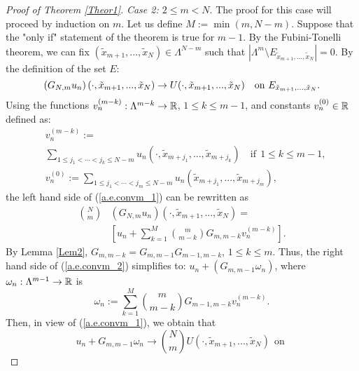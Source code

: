 \documentclass[12pt,leqno]{amsart}
\numberwithin{equation}{section}
\numberwithin{theor}{section}
\numberwithin{rem}{section}
\begin{document}
\begin{proof}[Proof of Theorem \ref{Theor1}]
\textit{Case 2: $2\leq m<N$}.  The proof for this case 
will proceed by induction on $m$.  Let us define 
$M:=\min(m,N-m)$.  Suppose that 
the "only if" 
statement of the theorem is true for $m-1$.  By the Fubini-Tonelli theorem, we can fix 
$(\tilde{x}_{m+1},...,\tilde{x}_N)\in \Lambda^{N-m}$ such that 
$\left | \Lambda^m\setminus 
E_{\tilde{x}_{m+1},...,\tilde{x}_N} \right | =0$.  By the definition of the set $E$:  
\begin{equation}
\label{a.e.convm_1}
\left (G_{N,m} u_n\right )(\cdot,\tilde{x}_{m+1},...,\tilde{x}_N)\rightarrow \\ U(\cdot,\tilde{x}_{m+1},...,\tilde{x}_N)~~\text{
on $E_{\tilde{x}_{m+1},...,\tilde{x}_N}$}.
\end{equation}
Using the functions $v_n^{(m-k)}:\Lambda^{m-k}\rightarrow \Bbb{R}$, $1\leq k\leq m-1$, and constants $v_n^{(0)}\in\Bbb{R}$ defined as:
\begin{equation}
\begin{split}
&v_n^{(m-k)}:=\\
&\sum_{1\leq j_1<\cdots<j_k\leq N-m} 
u_n(\cdot,\tilde{x}_{m+j_1},...,\tilde{x}_{m+j_k})\quad
\text{if}~~1\leq k\leq m-1, \\
&v_n^{(0)}:=\sum_{1\leq j_1<\cdots<j_m\leq N-m} 
u_n(\tilde{x}_{m+j_1},...,\tilde{x}_{m+j_m}),
\end{split}
\end{equation}
the left hand side of (\ref{a.e.convm_1}) can be rewritten as 
\begin{equation}
\label{a.e.convm_2}
\begin{split}
\binom{N}{m}
&\left (G_{N,m} u_n\right )(\cdot,\tilde{x}_{m+1},...,\tilde{x}_N)
=\\
&\left [ u_n + \sum_{k=1}^{M}\binom{m}{m-k} 
G_{m,m-k} v_n^{(m-k)}\right ].
\end{split}
\end{equation}
By Lemma \ref{Lem2}, $G_{m,m-k}=G_{m,m-1}G_{m-1,m-k}$, $1\leq k\leq m$.  Thus, the right hand side of (\ref{a.e.convm_2}) simplifies to:
$u_n + \left (G_{m,m-1} \omega_n\right )$,
where $\omega_n: \Lambda^{m-1}\rightarrow \Bbb{R}$ is 
\begin{equation}
\label{omega_n}
\omega_n:=\sum_{k=1}^{M}\binom{m}{m-k} 
G_{m-1,m-k} v_n^{(m-k)}.
\end{equation}
Then, in view of (\ref{a.e.convm_1}), we obtain that 
\begin{equation}
\label{a.e.convm_3}
u_n + G_{m,m-1} \omega_n 
\rightarrow \binom{N}{m}
U(\cdot,\tilde{x}_{m+1},...,\tilde{x}_N)~~ \text{on 
}
\end{equation}
\end{proof}
\end{document}
